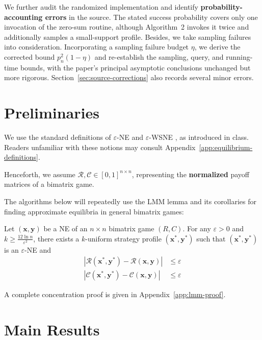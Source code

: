 We further audit the randomized implementation and identify \textbf{probability-accounting errors} in the source. The stated success probability covers only one invocation of the zero-sum routine, although Algorithm~2 invokes it twice and additionally samples a small-support profile. Besides, we take sampling failures into consideration. Incorporating a sampling failure budget $\eta$, we derive the corrected bound $p_n^2(1-\eta)$ and re-establish the sampling, query, and running-time bounds, with the paper's principal asymptotic conclusions unchanged but more rigorous. Section~\ref{sec:source-corrections} also records several minor errors.

\section{Preliminaries}

We use the standard definitions of $\varepsilon$-NE and $\varepsilon$-WSNE \cite[Section~2]{12WSNE}, as introduced in class. Readers unfamiliar with these notions may consult Appendix~\ref{app:equilibrium-definitions}.

Henceforth, we assume $\mathcal{R},\mathcal{C} \in [0, 1]^{n \times n}$, representing the \textbf{normalized} payoff matrices of a bimatrix game.

The algorithms below will repeatedly use the LMM lemma and its corollaries for finding approximate equilibria in general bimatrix games:

\begin{lemma}
  \label{lem:llm_thm}
  Let $(\mathbf{x}, \mathbf{y})$ be a NE of an $n \times n$ bimatrix game $(R, C)$. For any $\varepsilon > 0$ and $k \ge \frac{12 \ln n}{\varepsilon^2}$, there exists a $k$-uniform strategy profile $(\mathbf{x}^*, \mathbf{y}^*)$ such that $(\mathbf{x}^*, \mathbf{y}^*)$ is an $\varepsilon$-NE and
  \begin{align*}
    |\mathcal{R}(\mathbf{x}^*, \mathbf{y}^*) - \mathcal{R}(\mathbf{x}, \mathbf{y})| & \le \varepsilon \\
    |\mathcal{C}(\mathbf{x}^*, \mathbf{y}^*) - \mathcal{C}(\mathbf{x}, \mathbf{y})| & \le \varepsilon
  \end{align*}
\end{lemma}

A complete concentration proof is given in Appendix~\ref{app:lmm-proof}.

\section{Main Results}

